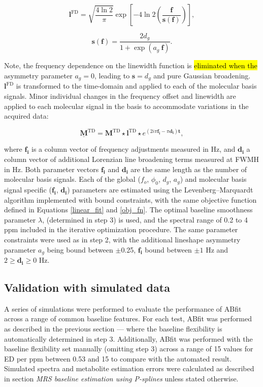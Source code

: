 \documentclass[num-refs]{wiley-article}
\newcommand{\revone}[2]{\hl{#1}\marginnote{\hl{#2}}}
\begin{document}
\begin{equation}
  \mathbf{l}^{\mathrm{FD}} = \sqrt{\frac{4 \ln 2}{\pi}} \exp \left[ -4 \ln2 \left( \frac{\mathbf{f}}{\mathbf{s}(\mathbf{f})} \right) \right],
\end{equation}

\begin{equation}
  \mathbf{s}(\mathbf{f}) = \frac{2 d_{g}}{1 + \exp(a_{g} \ \mathbf{f})}.
\end{equation}

Note, the frequency dependence on the linewidth function is \revone{eliminated when the}{R1.21} asymmetry parameter $a_{g}=0$, leading to $\mathbf{s}=d_{g}$ and pure Gaussian broadening. $\mathbf{l}^{\mathrm{FD}}$ is transformed to the time-domain and applied to each of the molecular basis signals. Minor individual changes in the frequency offset and linewidth are applied to each molecular signal in the basis to accommodate variations in the acquired data:

\begin{equation}
    \underline{\mathbf{M}}^{\mathrm{TD}} = \mathbf{M}^{\mathrm{TD}} \star \mathbf{l}^{\mathrm{TD}} \star e^{(2i \pi \mathbf{f_{i}} - \pi \mathbf{d_{i}} ) \mathbf{t}},
\end{equation}

where $\mathbf{f_{i}}$ is a column vector of frequency adjustments measured in Hz, and $\mathbf{d_{i}}$ a column vector of additional Lorenzian line broadening terms measured at FWMH in Hz. Both parameter vectors $\mathbf{f_{i}}$ and $\mathbf{d_{i}}$ are the same length as the number of molecular basis signals. Each of the global ($f_{o}$, $\phi_{0}$, $d_{g}$, $a_{g}$) and molecular basis signal specific ($\mathbf{f_{i}}$, $\mathbf{d_{i}}$) parameters are estimated using the Levenberg–Marquardt algorithm \cite{Levenberg1944} implemented with bound constraints, with the same objective function defined in Equations \ref{linear_fit} and \ref{obj_fn}. The optimal baseline smoothness parameter $\lambda$, (determined in step 3) is used, and the spectral range of 0.2 to 4 ppm included in the iterative optimization procedure. The same parameter constraints were used as in step 2, with the additional lineshape asymmetry parameter $a_{g}$ being bound between $\pm$0.25, $\mathbf{f_{i}}$ bound between $\pm1$ Hz and  $2 \geq \mathbf{d_{i}} \geq 0$ Hz.

\subsection{Validation with simulated data}
A series of simulations were performed to evaluate the performance of ABfit across a range of common baseline features. For each test, ABfit was performed as described in the previous section --- where the baseline flexibility is automatically determined in step 3. Additionally, ABfit was performed with the baseline flexibility set manually (omitting step 3) across a range of 15 values for ED per ppm between 0.53 and 15 to compare with the automated result. Simulated spectra and metabolite estimation errors were calculated as described in section \textit{MRS baseline estimation using P-splines} unless stated otherwise.
\end{document}
